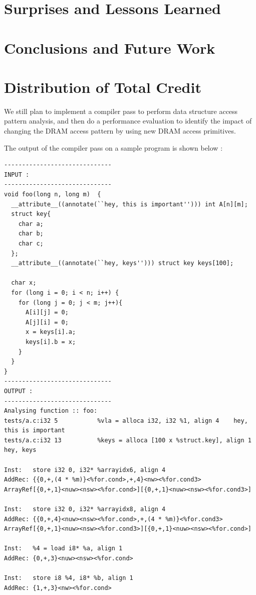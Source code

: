 \documentclass[letterpaper]{article}
\begin{document}
\section{Surprises and Lessons Learned}

\section{Conclusions and Future Work}

\section{Distribution of Total Credit}

We still plan to implement a compiler pass to perform data structure access pattern analysis, and
then do a performance evaluation to identify the impact of changing the DRAM
access pattern by using new DRAM access primitives.

The output of the compiler pass on a sample program is shown below :

\begin{Verbatim}[fontsize=\small]
------------------------------
INPUT :
------------------------------
void foo(long n, long m)  {
  __attribute__((annotate(``hey, this is important''))) int A[n][m];
  struct key{
    char a;
    char b;
    char c;
  };
  __attribute__((annotate(``hey, keys''))) struct key keys[100];

  char x;
  for (long i = 0; i < n; i++) {
    for (long j = 0; j < m; j++){
      A[i][j] = 0;
      A[j][i] = 0;
      x = keys[i].a;
      keys[i].b = x;
    }
  }
}
------------------------------
OUTPUT :
------------------------------
Analysing function :: foo:
tests/a.c:i32 5           %vla = alloca i32, i32 %1, align 4    hey, this is important
tests/a.c:i32 13          %keys = alloca [100 x %struct.key], align 1   hey, keys

Inst:   store i32 0, i32* %arrayidx6, align 4
AddRec: {{0,+,(4 * %m)}<%for.cond>,+,4}<nw><%for.cond3>
ArrayRef[{0,+,1}<nuw><nsw><%for.cond>][{0,+,1}<nuw><nsw><%for.cond3>]

Inst:   store i32 0, i32* %arrayidx8, align 4
AddRec: {{0,+,4}<nuw><nsw><%for.cond>,+,(4 * %m)}<%for.cond3>
ArrayRef[{0,+,1}<nuw><nsw><%for.cond3>][{0,+,1}<nuw><nsw><%for.cond>]

Inst:   %4 = load i8* %a, align 1
AddRec: {0,+,3}<nuw><nsw><%for.cond>

Inst:   store i8 %4, i8* %b, align 1
AddRec: {1,+,3}<nw><%for.cond>
\end{Verbatim}
\end{document}
